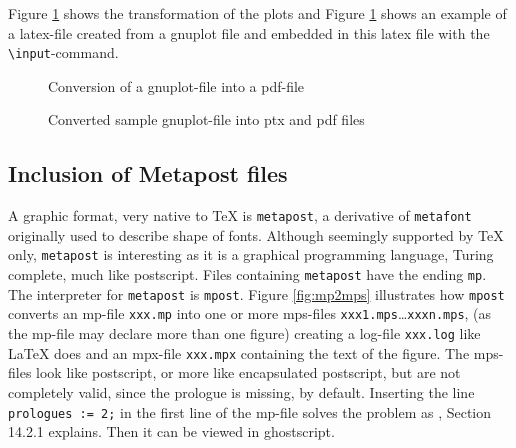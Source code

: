 \documentclass[12pt]{article}
\begin{document}
Figure \ref{fig:plt2pdf} shows the transformation of the plots 
and Figure \ref{fig:plt2pdf} shows an example of a latex-file 
created from a gnuplot file 
and embedded in this latex file with the {\tt\textbackslash input}-command. 

\begin{figure}[htb]
\begin{center}

\end{center}
\caption{\label{fig:plt2pdf}Conversion of a gnuplot-file into a pdf-file}
\end{figure}

\begin{figure}[htb]
\begin{center}

\end{center}
\caption{\label{fig:gnuplot}
Converted sample gnuplot-file into ptx and pdf files }
\end{figure}


\subsection{Inclusion of Metapost files}\label{subsec:metapost}

A graphic format, very native to TeX is {\tt metapost}, 
a derivative of {\tt metafont} originally used to describe shape of fonts. 
Although seemingly supported by TeX only, 
{\tt metapost} is interesting as it is a graphical programming language, 
Turing complete, much like postscript. 
Files containing {\tt metapost} have the ending {\tt mp}. 
The interpreter for {\tt metapost} is {\tt mpost}. 
Figure \ref{fig:mp2mps} illustrates how {\tt mpost} converts an mp-file 
{\tt xxx.mp} 
into one or more mps-files {\tt xxx1.mps}\dots {\tt xxxn.mps}, 
(as the mp-file may declare more than one figure) 
creating a log-file {\tt xxx.log} like LaTeX does 
and an mpx-file {\tt xxx.mpx} containing the text of the figure. 
The mps-files look like postscript, or more like encapsulated postscript, 
but are not completely valid, since the prologue is missing, by default. 
Inserting the line {\tt prologues := 2;} in the first line of the mp-file 
solves the problem as \cite{MPost}, Section 14.2.1 explains. 
Then it can be viewed in ghostscript. 
\end{document}
